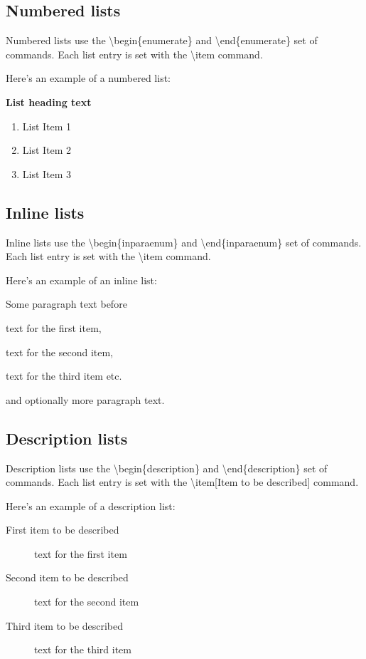 \documentclass[12pt]{MUNThesisBibTeX}
\begin{document}
\subsection{Numbered lists}

Numbered lists use the \textbackslash begin\{enumerate\} and \textbackslash end\{enumerate\} set of commands. Each list entry is set with the \textbackslash item command.

Here's an example of a numbered list:

\smallskip
\textbf{List heading text}
\begin{enumerate}
\item List Item 1
\item List Item 2
\item List Item 3
\end{enumerate}

\subsection{Inline lists}

Inline lists use the \textbackslash begin\{inparaenum\} and \textbackslash end\{inparaenum\} set of commands. Each list entry is set with the \textbackslash item command.

Here's an example of an inline list:

Some paragraph text before \begin{inparaenum}[(i)]\item text for the first item, \item text for the second item, \item text for the third item etc. \end{inparaenum} and optionally more paragraph text.

\subsection{Description lists}

Description lists use the \textbackslash begin\{description\} and \textbackslash end\{description\} set of commands. Each list entry is set with the \textbackslash item[Item to be described] command.

Here's an example of a description list:

\begin{description}
\item[First item to be described] text for the first item
\item[Second item to be described] text for the second item
\item[Third item to be described] text for the third item
\end{description}
\end{document}
